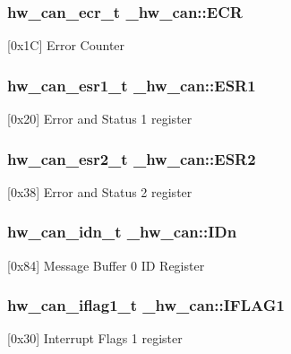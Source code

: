 \subsubsection[{\texorpdfstring{E\+CR}{ECR}}]{ {\bf hw\+\_\+can\+\_\+ecr\+\_\+t} \+\_\+hw\+\_\+can\+::\+E\+CR}\hypertarget{struct__hw__can_ae5b1470485d8001633bcdaa2cf101954}{}\label{struct__hw__can_ae5b1470485d8001633bcdaa2cf101954}
\mbox{[}0x1C\mbox{]} Error Counter 
\subsubsection[{\texorpdfstring{E\+S\+R1}{ESR1}}]{ {\bf hw\+\_\+can\+\_\+esr1\+\_\+t} \+\_\+hw\+\_\+can\+::\+E\+S\+R1}\hypertarget{struct__hw__can_a15bc587611b8fd680a7aa9f0585fb47c}{}\label{struct__hw__can_a15bc587611b8fd680a7aa9f0585fb47c}
\mbox{[}0x20\mbox{]} Error and Status 1 register 
\subsubsection[{\texorpdfstring{E\+S\+R2}{ESR2}}]{ {\bf hw\+\_\+can\+\_\+esr2\+\_\+t} \+\_\+hw\+\_\+can\+::\+E\+S\+R2}\hypertarget{struct__hw__can_ad525cd05794b16e66980db00bf7f5c19}{}\label{struct__hw__can_ad525cd05794b16e66980db00bf7f5c19}
\mbox{[}0x38\mbox{]} Error and Status 2 register 
\subsubsection[{\texorpdfstring{I\+Dn}{IDn}}]{ {\bf hw\+\_\+can\+\_\+idn\+\_\+t} \+\_\+hw\+\_\+can\+::\+I\+Dn}\hypertarget{struct__hw__can_a46aae925b14db08160b9b6c9fb4c0029}{}\label{struct__hw__can_a46aae925b14db08160b9b6c9fb4c0029}
\mbox{[}0x84\mbox{]} Message Buffer 0 ID Register 
\subsubsection[{\texorpdfstring{I\+F\+L\+A\+G1}{IFLAG1}}]{ {\bf hw\+\_\+can\+\_\+iflag1\+\_\+t} \+\_\+hw\+\_\+can\+::\+I\+F\+L\+A\+G1}\hypertarget{struct__hw__can_a5c43e6bb2474470e62f8a831eca221a1}{}\label{struct__hw__can_a5c43e6bb2474470e62f8a831eca221a1}
\mbox{[}0x30\mbox{]} Interrupt Flags 1 register 
